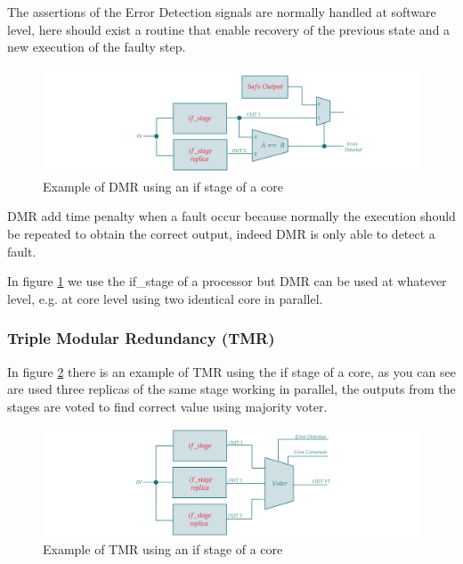 {{{{		        The assertions of the Error Detection signals are normally handled at software level, here should exist a routine that enable recovery of the previous state and a new execution of the faulty step.
		        
		        \begin{figure}[H]
        			\centering
        			\includegraphics[scale=0.2,center]{./images/DMR1.png}
        			\caption{Example of DMR using an if stage of a core}
        			\label{fig:DMR1}
        		\end{figure} 
        		
        		DMR add time penalty when a fault occur because normally the execution should be repeated to obtain the correct output, indeed DMR is only able to detect a fault. 
        		
        		In figure \ref{fig:DMR1} we use the if\_stage of a processor but DMR can be used at whatever level, e.g. at core level using two identical core in parallel.
		    }
		    \subsubsection{Triple Modular Redundancy (TMR)}{
		        In figure \ref{fig:TMR1} there is an example of TMR using the if stage of a core, as you can see are used three replicas of the same stage working in parallel, the outputs from the stages are voted to find correct value using majority voter.
		        
		        \begin{figure}[H]
        			\centering
        			\includegraphics[scale=0.2,center]{./images/TMR1.png}
        			\caption{Example of TMR using an if stage of a core}
        			\label{fig:TMR1}
        		\end{figure} 
        	
}}}}
